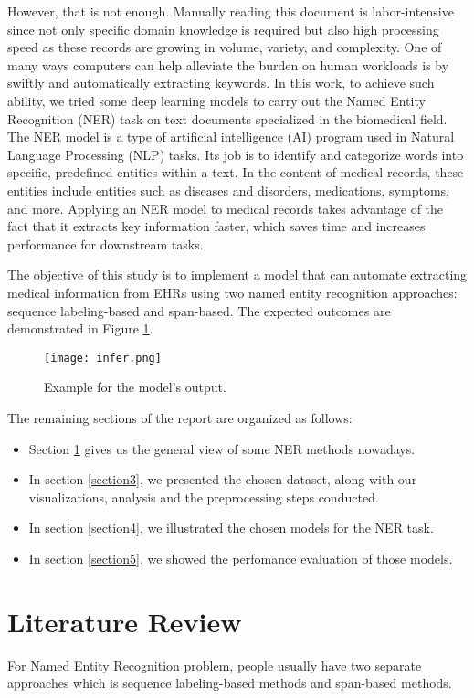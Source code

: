 \documentclass[conference]{IEEEtran}
\begin{document}
However, that is not enough. Manually reading this document is labor-intensive since not only 
specific domain knowledge is required but also high processing speed as these records are growing 
in volume, variety, and complexity. One of many ways computers can help alleviate the burden on 
human workloads is by swiftly and automatically extracting keywords. In this work, to achieve 
such ability, we tried some deep learning models to carry out the Named Entity Recognition (NER) 
task on text documents specialized in the biomedical field. The NER model is a type of artificial 
intelligence (AI) program used in Natural Language Processing (NLP) tasks. Its job is to 
identify and categorize words into specific, predefined entities within a text. In 
the content of medical records, these entities include entities such as diseases and disorders, 
medications, symptoms, and more. 
Applying an NER model to medical records takes advantage of the fact that it extracts key 
information faster, which saves time and increases performance for downstream tasks.

The objective of this study is to implement a model that can automate extracting medical 
information from EHRs using two named entity recognition approaches: sequence 
labeling-based and span-based. The expected outcomes are demonstrated in Figure \ref{fig1}.

\begin{figure}[h]
    \centering
    \texttt{[image: infer.png]}
    \caption{Example for the model’s output.}
    \label{fig1}
\end{figure}

The remaining sections of the report are organized as follows:
\begin{itemize}
    \item Section \ref{section2} gives us the general view of some NER methods nowadays.
    \item In section \ref{section3}, we presented the chosen dataset, along with our visualizations, 
    analysis and the preprocessing steps conducted.
    \item In section \ref{section4}, we illustrated the chosen models for the NER task.
    \item In section \ref{section5}, we showed the perfomance evaluation of those models.
\end{itemize}

\section{Literature Review}  \label{section2}
For Named Entity Recognition problem, people usually have two separate approaches which is
sequence labeling-based methods and span-based methods.
\end{document}
